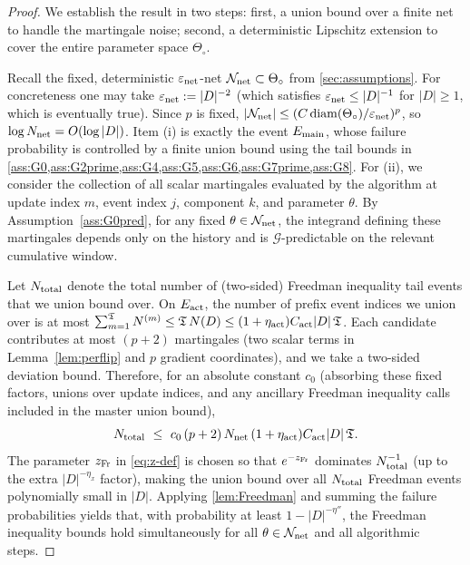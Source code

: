 \documentclass{statsoc}
\newcommand{\1}{\mathbbm{1}}
\newcommand{\Tmax}{\mathfrak{T}}
\begin{document}
\begin{proof}
We establish the result in two steps: first, a union bound over a finite net to handle the martingale noise; second, a deterministic Lipschitz extension to cover the entire parameter space $\Theta_\circ$.

Recall the fixed, deterministic $\varepsilon_{\rm net}$-net $\mathcal{N}_{\rm net} \subset \Theta_\circ$ from \cref{sec:assumptions}. For concreteness one may take $\varepsilon_{\rm net}:=|D|^{-2}$ (which satisfies $\varepsilon_{\rm net}\le |D|^{-1}$ for $|D|\ge 1$, which is eventually true). Since $p$ is fixed, $|\mathcal{N}_{\rm net}| \le (C \operatorname{diam}(\Theta_\circ)/\varepsilon_{\rm net})^p$, so $\log N_{\rm net} = O(\log |D|)$.
Item (i) is exactly the event $E_{\rm main}$, whose failure probability is controlled by a finite union bound using the
tail bounds in \cref{ass:G0,ass:G2prime,ass:G4,ass:G5,ass:G6,ass:G7prime,ass:G8}. For (ii), we consider the collection of all scalar martingales evaluated by the algorithm at update index \(m\), event index $j$, component $k$, and parameter $\theta$. By Assumption~\ref{ass:G0pred}, for any fixed $\theta \in \mathcal{N}_{\rm net}$, the integrand defining these martingales depends only on the history and is $\mathcal{G}$-predictable on the relevant cumulative window.

Let $N_{\rm total}$  denote the total number of (two-sided) Freedman inequality tail events that we union bound over. On $E_{\rm act}$, the number of prefix event indices we union over is at most $\sum_{m=1}^{\Tmax}N^{(m)}\le \Tmax\,N(D)\le (1+\eta_{\rm act})C_{\rm act}|D|\,\Tmax$. Each candidate contributes at most $(p+2)$ martingales (two scalar terms in Lemma~\ref{lem:perflip} and $p$ gradient coordinates), and we take a two-sided deviation bound. Therefore, for an absolute constant $c_0$ (absorbing these fixed factors, unions over update indices, and any ancillary Freedman inequality calls included in the master union bound),
\[
N_{\rm total}\ \le\ c_0\,(p+2)\,N_{\rm net}\,(1+\eta_{\rm act})C_{\rm act}|D|\,\Tmax.
\]
The parameter $z_{\rm Fr}$ in \eqref{eq:z-def} is chosen so that $e^{-z_{\rm Fr}}$ dominates $N_{\rm total}^{-1}$ (up to the extra $|D|^{-\eta_x}$ factor), making the union bound over all $N_{\rm total}$ Freedman events polynomially small in $|D|$. Applying \cref{lem:Freedman} and summing the failure probabilities yields that, with probability at least $1 - |D|^{-\eta''}$, the Freedman inequality bounds hold simultaneously for all $\theta \in \mathcal{N}_{\rm net}$ and all algorithmic steps.


\end{proof}
\end{document}

